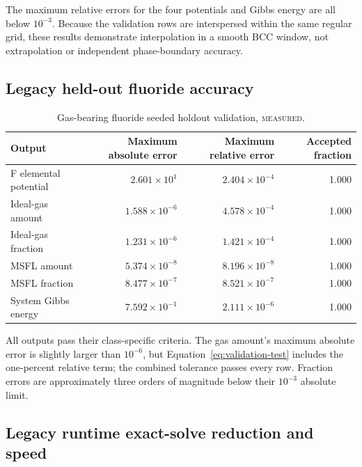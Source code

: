 \documentclass[11pt]{article}
\newcommand{\measured}{\textsc{measured}}
\begin{document}
The maximum relative errors for the four potentials and Gibbs energy are all below \(10^{-3}\).
Because the validation rows are interspersed within the same regular grid, these results
demonstrate interpolation in a smooth BCC window, not extrapolation or independent phase-boundary
accuracy.

\subsection{Legacy held-out fluoride accuracy}

\begin{table}[htbp]
  \centering
  \caption{Gas-bearing fluoride seeded holdout validation, \measured.}
  \label{tab:fluoride-validation}
  \small
  \begin{tabular}{lrrr}
    \toprule
    Output & Maximum absolute error & Maximum relative error & Accepted fraction \\
    \midrule
    F elemental potential & \(2.601\times10^{1}\) & \(2.404\times10^{-4}\) & 1.000 \\
    Ideal-gas amount & \(1.588\times10^{-6}\) & \(4.578\times10^{-4}\) & 1.000 \\
    Ideal-gas fraction & \(1.231\times10^{-6}\) & \(1.421\times10^{-4}\) & 1.000 \\
    MSFL amount & \(5.374\times10^{-8}\) & \(8.196\times10^{-8}\) & 1.000 \\
    MSFL fraction & \(8.477\times10^{-7}\) & \(8.521\times10^{-7}\) & 1.000 \\
    System Gibbs energy & \(7.592\times10^{-1}\) & \(2.111\times10^{-6}\) & 1.000 \\
    \bottomrule
  \end{tabular}
\end{table}

All outputs pass their class-specific criteria.  The gas amount's maximum absolute error is
slightly larger than \(10^{-6}\), but Equation~\eqref{eq:validation-test} includes the one-percent
relative term; the combined tolerance passes every row.  Fraction errors are approximately three
orders of magnitude below their \(10^{-3}\) absolute limit.

\subsection{Legacy runtime exact-solve reduction and speed}
\end{document}
